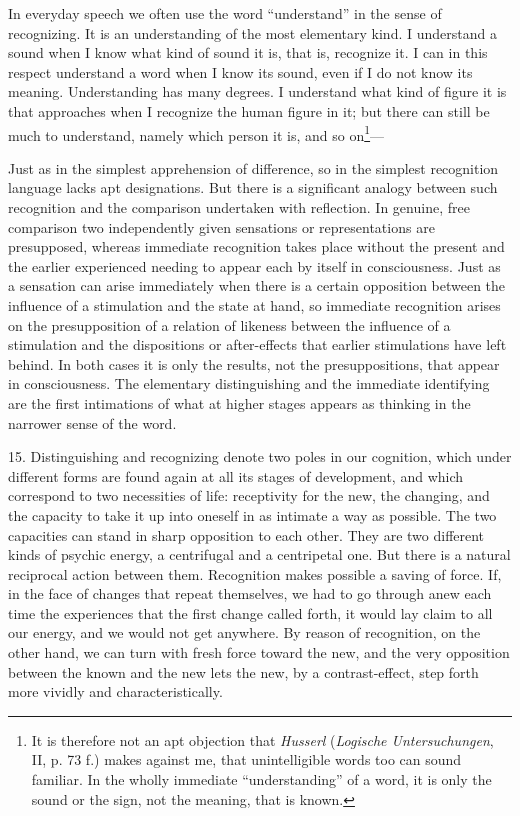\documentclass[12pt,a4paper]{book}
\newcommand{\opage}[1]{\marginnote{\footnotesize\textit{[#1]}}}
\begin{document}
In everyday speech we often use the word ``understand'' in the sense of
recognizing. It is an understanding of the most elementary kind. I
understand a sound when I know what kind of sound it is, that is,
recognize it. I can in this respect understand a word when I know its
sound, even if I do not know its meaning. Understanding has many degrees.
I understand what kind of figure it is that approaches when I recognize
the human figure in it; but there can still be much to understand, namely
which person it is, and so on\footnote{It is therefore not an apt
objection that \emph{Husserl} (\emph{Logische Untersuchungen}, II, p. 73
f.) makes against me, that unintelligible words too can sound familiar. In
the wholly immediate ``understanding'' of a word, it is only the sound or
the sign, not the meaning, that is known.}---

Just as in the simplest apprehension of difference, so in the simplest
recognition language lacks apt designations. But there is a significant
analogy between such recognition and the comparison undertaken with
reflection. In genuine, free comparison two independently given
sensations or representations are presupposed, whereas immediate
recognition takes place without the present and the earlier experienced
needing to appear each by itself in consciousness. Just as a sensation
can arise immediately when there is a certain opposition between the
influence of a stimulation and the state at hand, so immediate
recognition arises on the presupposition of a relation of likeness
between the influence of a stimulation and the dispositions or
after-effects that earlier stimulations have left behind. In both cases
it is only the results, not the presuppositions, \opage{49}that appear in
consciousness. The elementary distinguishing and the immediate
identifying are the first intimations of what at higher stages appears as
thinking in the narrower sense of the word.

15. Distinguishing and recognizing denote two poles in our cognition,
which under different forms are found again at all its stages of
development, and which correspond to two necessities of life: receptivity
for the new, the changing, and the capacity to take it up into oneself in
as intimate a way as possible. The two capacities can stand in sharp
opposition to each other. They are two different kinds of psychic energy,
a centrifugal and a centripetal one. But there is a natural reciprocal
action between them. Recognition makes possible a saving of force. If, in
the face of changes that repeat themselves, we had to go through anew
each time the experiences that the first change called forth, it would
lay claim to all our energy, and we would not get anywhere. By reason of
recognition, on the other hand, we can turn with fresh force toward the
new, and the very opposition between the known and the new lets the new,
by a contrast-effect, step forth more vividly and characteristically.
\end{document}
